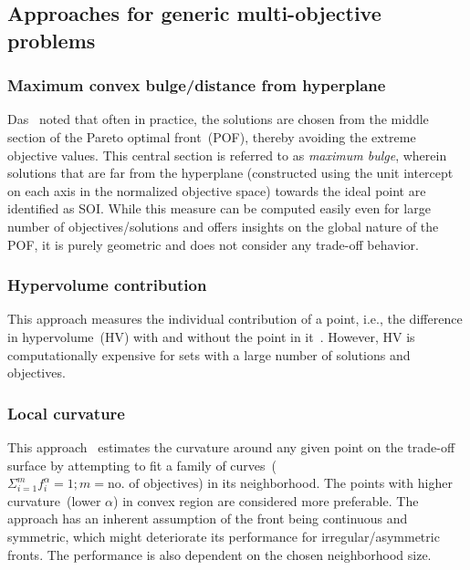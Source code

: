 \subsection{Approaches for generic multi-objective problems}

\subsubsection{Maximum convex bulge/distance from hyperplane} Das~\cite{das_characterizing_1999} noted that often in practice, the solutions are chosen from the middle section of the Pareto optimal front~(POF), thereby avoiding the extreme objective values. This central section is referred to as \textit{maximum bulge}, wherein solutions that are far from the hyperplane (constructed using the unit intercept on each axis in the normalized objective space) towards the ideal point are identified as SOI. While this measure can be computed easily even for large number of objectives/solutions and offers insights on the global nature of the POF, it is purely geometric and does not consider any trade-off behavior. 

\subsubsection{Hypervolume contribution} This approach measures the individual contribution of a point, i.e., the difference in hypervolume~(HV) with and without the point in it~\cite{zhang_knee_2014}. However, HV is computationally expensive for sets with a large number of solutions and objectives.

\subsubsection{Local curvature} This approach~\cite{bhattacharjee2016soi} estimates the curvature around any given point on the trade-off surface by attempting to fit a family of curves~($\Sigma^{m}_{i=1}f^\alpha_i=1; m=\text{no. of objectives}$) in its neighborhood. The points with higher curvature~(lower $\alpha$) in convex region are considered more preferable. The approach has an inherent assumption of the front being continuous and symmetric, which might deteriorate its performance for irregular/asymmetric fronts. The performance is also dependent on the chosen neighborhood size. 

